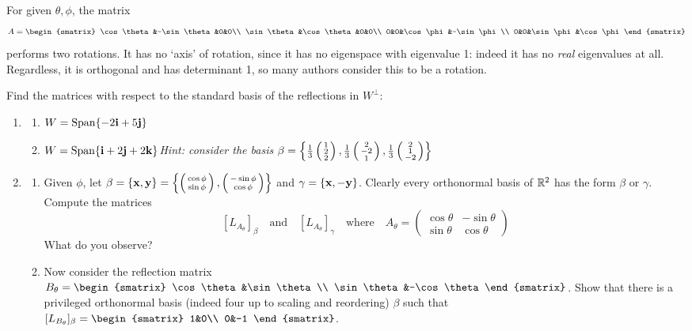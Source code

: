 \begin{example}{}{}
For given $\theta,\phi$, the matrix
\[A=\begin{smatrix}
  \cos\theta&-\sin\theta&0&0\\
  \sin\theta&\cos\theta&0&0\\
  0&0&\cos\phi&-\sin\phi\\
  0&0&\sin\phi&\cos\phi
\end{smatrix}\]
performs two rotations. It has no `axis' of rotation, since it has no eigenspace with eigenvalue 1: indeed it has no \emph{real} eigenvalues at all. Regardless, it is orthogonal and has determinant 1, so many authors consider this to be a rotation.
\end{example}

\begin{exercises}
\exstart Find the matrices with respect to the standard basis of the reflections in $W^\perp$:

\begin{enumerate}
	\item[]\begin{enumerate}
	  \item $W=\operatorname{Span}\{-2{\mathbf{i}}+5{\mathbf{j}}\}$
	  \item $W=\operatorname{Span}\{{\mathbf{i}}+2{\mathbf{j}}+2{\mathbf{k}}\}$\quad  \emph{Hint: consider the basis $\beta=\left\{\frac 13\left(\begin{smallmatrix}1\\2\\2\end{smallmatrix}\right),\frac 13\left(\begin{smallmatrix}2\\-2\\1\end{smallmatrix}\right),\frac 13\left(\begin{smallmatrix}2\\1\\-2\end{smallmatrix}\right)\right\}$}
	\end{enumerate}
	
  \item\begin{enumerate}
  	\item Given $\phi$, let $\beta=\{{\mathbf{x}},{\mathbf{y}}\}=\left\{\left(\begin{smallmatrix}\cos\phi\\\sin\phi\end{smallmatrix}\right),\left(\begin{smallmatrix}-\sin\phi\\\cos\phi\end{smallmatrix}\right)\right\}$ and $\gamma=\{{\mathbf{x}},-{\mathbf{y}}\}$. Clearly every orthonormal basis of $\mathbb{R}^2$ has the form $\beta$ or $\gamma$. Compute the matrices
  	\[[L_{A_\theta}]_\beta\quad\text{and}\quad[L_{A_\theta}]_\gamma\quad\text{where}\quad A_\theta=\begin{pmatrix}
		\cos\theta&-\sin\theta\\
		\sin\theta&\cos\theta
  	\end{pmatrix}\]
  	What do you observe?
  	\item Now consider the reflection matrix $B_\theta=\begin{smatrix}
		\cos\theta&\sin\theta\\
		\sin\theta&-\cos\theta
  	\end{smatrix}$. Show that there is a privileged orthonormal basis (indeed four up to scaling and reordering) $\beta$ such that $[L_{B_\theta}]_\beta=\begin{smatrix}
		1&0\\
		0&-1
  	\end{smatrix}$.
 	\end{enumerate}
 	

\end{enumerate}
\end{exercises}

